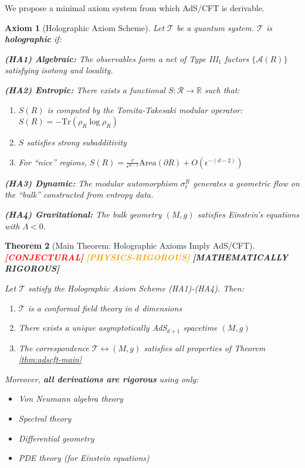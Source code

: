 \documentclass[12pt,a4paper]{article}
\newtheorem{theorem}{Theorem}[section]
\newtheorem{axiom}[theorem]{Axiom}
\newcommand{\rigormark}[1]{%
  \ifcase#1
    \textcolor{red}{\textbf{[CONJECTURAL]}}%
  \or
    \textcolor{orange}{\textbf{[PHYSICS-RIGOROUS]}}%
  \or
    \textcolor{green!50!black}{\textbf{[MATHEMATICALLY RIGOROUS]}}%
  \fi
}
\begin{document}
We propose a minimal axiom system from which AdS/CFT is derivable.

\begin{axiom}[Holographic Axiom Scheme]\label{axiom:holo-scheme}
Let $\mathcal{T}$ be a quantum system. $\mathcal{T}$ is \textbf{holographic} if:

\textbf{(HA1) Algebraic:} The observables form a net of Type III$_1$ factors $\{\mathcal{A}(R)\}$ satisfying isotony and locality.

\textbf{(HA2) Entropic:} There exists a functional $S: \mathcal{R} \to \mathbb{R}$ such that:
\begin{enumerate}
    \item $S(R)$ is computed by the Tomita-Takesaki modular operator: $S(R) = -\text{Tr}(\rho_R \log \rho_R)$
    \item $S$ satisfies strong subadditivity
    \item For ``nice'' regions, $S(R) = \frac{c}{\epsilon^{d-1}}\text{Area}(\partial R) + O(\epsilon^{-(d-2)})$
\end{enumerate}

\textbf{(HA3) Dynamic:} The modular automorphism $\sigma^R_t$ generates a geometric flow on the ``bulk'' constructed from entropy data.

\textbf{(HA4) Gravitational:} The bulk geometry $(M, g)$ satisfies Einstein's equations with $\Lambda < 0$.
\end{axiom}

\begin{theorem}[Main Theorem: Holographic Axioms Imply AdS/CFT]\label{thm:main-holo-axioms}
\rigormark{2}

Let $\mathcal{T}$ satisfy the Holographic Axiom Scheme (HA1)-(HA4). Then:
\begin{enumerate}
    \item $\mathcal{T}$ is a conformal field theory in $d$ dimensions
    \item There exists a unique asymptotically AdS$_{d+1}$ spacetime $(M, g)$
    \item The correspondence $\mathcal{T} \leftrightarrow (M, g)$ satisfies all properties of Theorem \ref{thm:adscft-main}
\end{enumerate}

Moreover, \textbf{all derivations are rigorous} using only:
\begin{itemize}
    \item Von Neumann algebra theory
    \item Spectral theory
    \item Differential geometry
    \item PDE theory (for Einstein equations)
\end{itemize}
\end{theorem}
\end{document}
